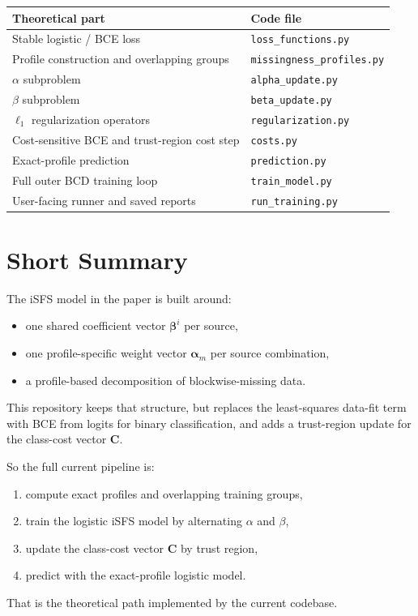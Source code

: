 \documentclass[11pt]{article}
\newcommand{\alpham}{\boldsymbol{\alpha}_m}
\newcommand{\betai}{\boldsymbol{\beta}^i}
\newcommand{\costvec}{\mathbf{C}}
\begin{document}
\begin{center}
\begin{tabular}{ll}
\toprule
Theoretical part & Code file \\
\midrule
Stable logistic / BCE loss & \texttt{loss\_functions.py} \\
Profile construction and overlapping groups & \texttt{missingness\_profiles.py} \\
$\alpha$ subproblem & \texttt{alpha\_update.py} \\
$\beta$ subproblem & \texttt{beta\_update.py} \\
$\ell_1$ regularization operators & \texttt{regularization.py} \\
Cost-sensitive BCE and trust-region cost step & \texttt{costs.py} \\
Exact-profile prediction & \texttt{prediction.py} \\
Full outer BCD training loop & \texttt{train\_model.py} \\
User-facing runner and saved reports & \texttt{run\_training.py} \\
\bottomrule
\end{tabular}
\end{center}

\section{Short Summary}

The iSFS model in the paper is built around:
\begin{itemize}
  \item one shared coefficient vector $\betai$ per source,
  \item one profile-specific weight vector $\alpham$ per source combination,
  \item a profile-based decomposition of blockwise-missing data.
\end{itemize}

This repository keeps that structure, but replaces the least-squares data-fit
term with BCE from logits for binary classification, and adds a trust-region
update for the class-cost vector $\costvec$.

So the full current pipeline is:
\begin{enumerate}
  \item compute exact profiles and overlapping training groups,
  \item train the logistic iSFS model by alternating $\alpha$ and $\beta$,
  \item update the class-cost vector $\costvec$ by trust region,
  \item predict with the exact-profile logistic model.
\end{enumerate}

That is the theoretical path implemented by the current codebase.
\end{document}

